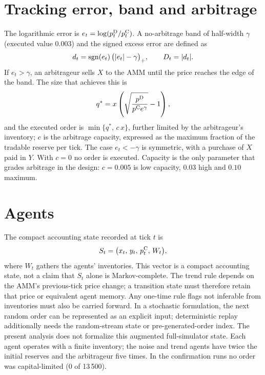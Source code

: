 \section{Tracking error, band and arbitrage}

The logarithmic error is $e_t=\log(p^{\mathrm{D}}_t/p^{\mathrm{C}}_t)$. A no-arbitrage band of half-width $\gamma$ (executed value $0.003$) and the signed excess error are defined as
\begin{equation}
  d_t = \operatorname{sgn}(e_t)\,\bigl(|e_t|-\gamma\bigr)_+ ,\qquad D_t=|d_t|.
  \label{eq:exceso}
\end{equation}
If $e_t>\gamma$, an arbitrageur sells $X$ to the AMM until the price reaches the edge of the band. The size that achieves this is
\begin{equation}
  q^{\ast} = x\left(\sqrt{\frac{p^{\mathrm{D}}}{p^{\mathrm{C}} e^{\gamma}}}-1\right),
  \label{eq:qstar}
\end{equation}
and the executed order is $\min\{q^{\ast},\,c\,x\}$, further limited by the arbitrageur's inventory; $c$ is the arbitrage capacity, expressed as the maximum fraction of the tradable reserve per tick. The case $e_t<-\gamma$ is symmetric, with a purchase of $X$ paid in $Y$. With $c=0$ no order is executed. Capacity is the only parameter that grades arbitrage in the design: $c=0.005$ is low capacity, $0.03$ high and $0.10$ maximum.

\section{Agents}

The compact accounting state recorded at tick $t$ is
\begin{equation}
  S_t = \bigl(x_t,\,y_t,\,p^{\mathrm{C}}_t,\,W_t\bigr),
  \label{eq:estado}
\end{equation}
where $W_t$ gathers the agents' inventories. This vector is a compact accounting state, not a claim that $S_t$ alone is Markov-complete. The trend rule depends on the AMM's previous-tick price change; a transition state must therefore retain that price or equivalent agent memory. Any one-time rule flags not inferable from inventories must also be carried forward. In a stochastic formulation, the next random order can be represented as an explicit input; deterministic replay additionally needs the random-stream state or pre-generated-order index. The present analysis does not formalize this augmented full-simulator state. Each agent operates with a finite inventory; the noise and trend agents have twice the initial reserves and the arbitrageur five times. In the confirmation runs no order was capital-limited (0 of 13\,500).

